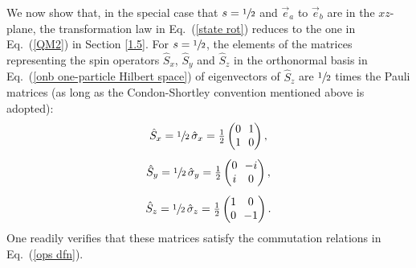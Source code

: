We now show that, in the special case that $s = \sfrac12$ and $\vec{e}_a$ to $\vec{e}_b$ are in the $xz$-plane, the transformation law in Eq.\ (\ref{state rot}) reduces to the one in Eq.\ (\ref{QM2}) in Section \ref{1.5}. For $s = \sfrac12$, the elements of the matrices representing the spin operators $\hat{S}_x$, $\hat{S}_y$ and $\hat{S}_z$  in the orthonormal basis  in Eq.\ (\ref{onb one-particle Hilbert space}) of eigenvectors of $\hat{S}_z$ are $\sfrac12$ times the Pauli matrices (as long as the Condon-Shortley convention mentioned above is adopted):
\begin{equation}
\begin{array}{c}
\hat{S}_x = \sfrac12 \, \hat{\sigma}_x = \frac12 \begin{pmatrix} 
0  \! & \! 1 \\
1 \! & \! 0
\end{pmatrix},  \\[.5cm]
\hat{S}_y = \sfrac12 \, \hat{\sigma}_y = \frac12 \begin{pmatrix} 
0  \! & \! - i \\
i \! & \! 0
\end{pmatrix}, \\[.5cm]
\hat{S}_z = \sfrac12 \, \hat{\sigma}_z = \frac12 \begin{pmatrix} 
1 \! & \! 0 \\
0 \! & \! -1
\end{pmatrix}.
\end{array}
\label{Pauli matrices}
\end{equation}
One readily verifies that these matrices satisfy the commutation relations in Eq.\ (\ref{ops dfn}).

